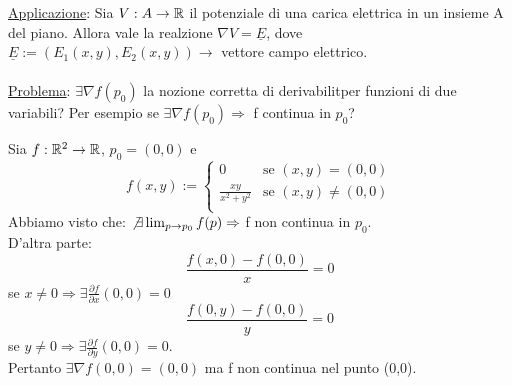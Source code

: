 \underline{Applicazione}: Sia $V:A\to \mathbb{R}$ il potenziale di una carica elettrica in un insieme A del piano. Allora 
vale la realzione $\nabla V = \underline{E}$, dove $\underline{E} := (E_1(x,y),E_2(x,y)) \rightarrow $ vettore campo elettrico.\\\\
\underline{Problema}: $\exists\nabla f(p_0)$ \ace la nozione corretta di derivabilit\aca per funzioni di due variabili? 
Per esempio se $\exists\nabla f(p_0) \Rightarrow $ f \ace continua in $p_0$?
\begin{example}
  Sia $f: \mathbb{R}^2 \to\mathbb{R}$, $p_0 = (0,0)$ e
  $$f(x,y):= \left\{\begin{array}{cl}
    0 & \text{se } (x,y) = (0,0) \\
    \frac{xy}{x^2+y^2} & \text{se } (x,y) \not = (0,0) \\
  \end{array}\right.$$
  Abbiamo visto che: $\not \exists \lim_{p \to p_0} f(p) \Rightarrow $ f non \ace continua in $p_0$.\\
  D'altra parte:
  $$\frac{f(x,0)-f(0,0)}{x} = 0$$
  se $x\not = 0 \Rightarrow \exists \frac{\partial f}{\partial x}(0,0) = 0$
  $$\frac{f(0,y)-f(0,0)}{y} = 0$$
  se $y\not = 0 \Rightarrow \exists \frac{\partial f}{\partial y}(0,0) = 0$. \\
  Pertanto $\exists \nabla f(0,0) = (0,0)$  ma f non \ace continua nel punto (0,0).
\end{example}
